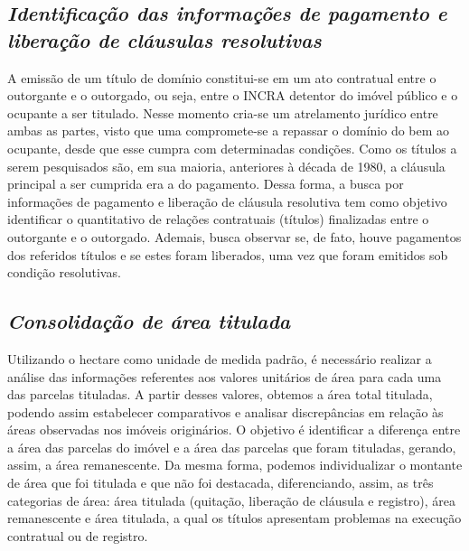 \documentclass[
  letterpaper,
]{report}
\begin{document}
\hypertarget{identificauxe7uxe3o-das-informauxe7uxf5es-de-pagamento-e-liberauxe7uxe3o-de-cluxe1usulas-resolutivas}{%
\subsection{\texorpdfstring{\emph{Identificação das informações de
pagamento e liberação de cláusulas
resolutivas}}{Identificação das informações de pagamento e liberação de cláusulas resolutivas}}\label{identificauxe7uxe3o-das-informauxe7uxf5es-de-pagamento-e-liberauxe7uxe3o-de-cluxe1usulas-resolutivas}}

A emissão de um título de domínio constitui-se em um ato contratual
entre o outorgante e o outorgado, ou seja, entre o INCRA detentor do
imóvel público e o ocupante a ser titulado. Nesse momento cria-se um
atrelamento jurídico entre ambas as partes, visto que uma compromete-se
a repassar o domínio do bem ao ocupante, desde que esse cumpra com
determinadas condições. Como os títulos a serem pesquisados são, em sua
maioria, anteriores à década de 1980, a cláusula principal a ser
cumprida era a do pagamento. Dessa forma, a busca por informações de
pagamento e liberação de cláusula resolutiva tem como objetivo
identificar o quantitativo de relações contratuais (títulos) finalizadas
entre o outorgante e o outorgado. Ademais, busca observar se, de fato,
houve pagamentos dos referidos títulos e se estes foram liberados, uma
vez que foram emitidos sob condição resolutivas.

\hypertarget{consolidauxe7uxe3o-de-uxe1rea-titulada}{%
\subsection{\texorpdfstring{\emph{Consolidação de área
titulada}}{Consolidação de área titulada}}\label{consolidauxe7uxe3o-de-uxe1rea-titulada}}

Utilizando o hectare como unidade de medida padrão, é necessário
realizar a análise das informações referentes aos valores unitários de
área para cada uma das parcelas tituladas. A partir desses valores,
obtemos a área total titulada, podendo assim estabelecer comparativos e
analisar discrepâncias em relação às áreas observadas nos imóveis
originários. O objetivo é identificar a diferença entre a área das
parcelas do imóvel e a área das parcelas que foram tituladas, gerando,
assim, a área remanescente. Da mesma forma, podemos individualizar o
montante de área que foi titulada e que não foi destacada,
diferenciando, assim, as três categorias de área: área titulada
(quitação, liberação de cláusula e registro), área remanescente e área
titulada, a qual os títulos apresentam problemas na execução contratual
ou de registro.
\end{document}
